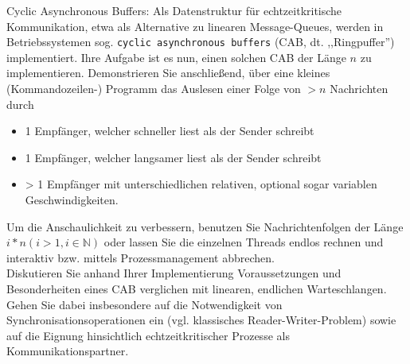 \documentclass[10pt, a4paper]{exam}
\begin{document}
\begin{questions}
  \question Cyclic Asynchronous Buffers: Als Datenstruktur für echtzeitkritische Kommunikation, etwa als Alternative zu linearen Message-Queues, werden in Betriebssystemen sog. \texttt{cyclic asynchronous buffers} (CAB, dt. ,,Ringpuffer'') implementiert. Ihre Aufgabe ist es nun, einen solchen CAB der Länge $n$ zu implementieren. Demonstrieren Sie anschließend, über eine kleines (Kommandozeilen-) Programm das Auslesen einer Folge von $>n$ Nachrichten durch
  \begin{itemize}
    \item 1 Empfänger, welcher schneller liest als der Sender schreibt
    \item 1 Empfänger, welcher langsamer liest als der Sender schreibt
    \item > 1 Empfänger mit unterschiedlichen relativen, optional sogar variablen Geschwindigkeiten.
  \end{itemize}
  Um die Anschaulichkeit zu verbessern, benutzen Sie Nachrichtenfolgen der Länge $i*n( i > 1 ,i\in\mathbb{N})$ oder lassen Sie die einzelnen Threads endlos rechnen und interaktiv bzw. mittels Prozessmanagement abbrechen.\\
  Diskutieren Sie anhand Ihrer Implementierung Voraussetzungen und Besonderheiten eines CAB verglichen mit linearen, endlichen Warteschlangen. Gehen Sie dabei insbesondere auf die Notwendigkeit von Synchronisationsoperationen ein (vgl. klassisches Reader-Writer-Problem) sowie auf die Eignung hinsichtlich echtzeitkritischer Prozesse als Kommunikationspartner.
  \begin{solution}
  \end{solution}

\end{questions}
\end{document}
